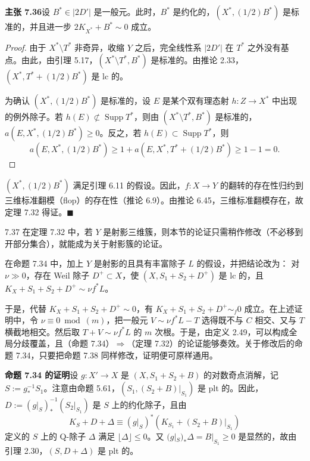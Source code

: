 
\par\medskip\noindent\textbf{主张 7.36}\quad 设 $B^*\in|2D'|$ 是一般元。此时，$B^*$ 是约化的，$(X^*,(1/2)B^*)$ 是标准的，并且进一步 $2K_{X^*}+B^*\sim0$ 成立。

\begin{proof}
由于 $X^*\setminus T^*$ 非奇异，收缩 $Y$ 之后，完全线性系 $|2D'|$ 在 $T^*$ 之外没有基点。由此，由引理 5.17，$(X^*\setminus T^*,B^*)$ 是标准的。由推论 2.33，$(X^*,T^*+(1/2)B^*)$ 是 lc 的。

为确认 $(X^*,(1/2)B^*)$ 是标准的，设 $E$ 是某个双有理态射 $h\colon Z\to X^*$ 中出现的例外除子。若 $h(E)\not\subset\operatorname{Supp}T^*$，则由 $(X^*\setminus T^*,B^*)$ 是标准的，$a(E,X^*,(1/2)B^*)\ge0$。反之，若 $h(E)\subset\operatorname{Supp}T^*$，则
\[
a(E,X^*,(1/2)B^*)\ge1+a(E,X^*,T^*+(1/2)B^*)\ge1-1=0.
\]
\end{proof}

$(X^*,(1/2)B^*)$ 满足引理 6.11 的假设。因此，$f\colon X\to Y$ 的翻转的存在性归约到三维标准翻模（flop）的存在性（推论 6.9）。由推论 6.45，三维标准翻模存在，故定理 7.32 得证。\hfill$\blacksquare$

\begin{remark}{7.37}
在定理 7.32 中，若 $Y$ 是射影三维簇，则本节的论证只需稍作修改（不必移到开部分集合），就能成为关于射影簇的论证。

在命题 7.34 中，加上 $Y$ 是射影的且具有丰富除子 $L$ 的假设，并把结论改为：
对 $\nu\gg0$，存在 Weil 除子 $D^+\subset X$，使 $(X,S_1+S_2+D^+)$ 是 lc 的，且 $K_X+S_1+S_2+D^+\sim\nu f^*L$。

于是，代替 $K_X+S_1+S_2+D^+\sim0$，有 $K_X+S_1+S_2+D^+\sim_f0$ 成立。在上述证明中，令 $\nu\equiv0\bmod(m)$，把一般元 $V\sim\nu f^*L-T$ 选得既不与 $C$ 相交、又与 $T$ 横截地相交。然后取 $T+V\sim\nu f^*L$ 的 $m$ 次根。于是，由定义 2.49，可以构成全局分歧覆盖，且（命题 7.34）$\Rightarrow$（定理 7.32）的论证能够奏效。关于修改后的命题 7.34，只要把命题 7.38 同样修改，证明便可原样通用。
\end{remark}

\par\medskip\noindent\textbf{命题 7.34 的证明}\quad 设 $g\colon X'\to X$ 是 $(X,S_1+S_2+B)$ 的对数奇点消解，记 $S:=g_*^{-1}S_1$。注意由命题 5.61，$(S_1,(S_2+B)|_{S_1})$ 是 plt 的。因此，$D:=(g|_S)_*^{-1}(S_2|_{S_1})$ 是 $S$ 上的约化除子，且由
\[
K_S+D+\Delta\equiv(g|_S)^*(K_{S_1}+(S_2+B)|_{S_1})
\]
定义的 $S$ 上的 Q-除子 $\Delta$ 满足 $\lfloor\Delta\rfloor\le0$。又 $(g|_S)_*\Delta=B|_{S_1}\ge0$ 是显然的，故由引理 2.30，$(S,D+\Delta)$ 是 plt 的。

